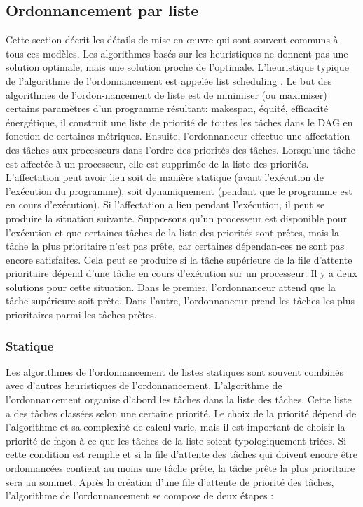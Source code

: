 \subsection{Ordonnancement par liste}
%
Cette section décrit les détails de mise en œuvre qui sont souvent communs à tous ces modèles. 
Les algorithmes basés sur les heuristiques ne donnent pas une solution optimale, mais une solution proche de l'optimale. 
L'heuristique typique de l'algorithme de l'ordonnancement est appelée list scheduling \cite{KA99}. 
Le but des algorithmes de l'ordon-nancement de liste est de minimiser (ou maximiser) certains paramètres d'un programme résultant: makespan, équité, efficacité énergétique, 
il construit une liste de priorité de toutes les tâches dans le DAG en fonction de certaines métriques. 
Ensuite, l'ordonnanceur effectue une affectation des tâches aux processeurs dans l'ordre des priorités des tâches. 
Lorsqu'une tâche est affectée à un processeur, elle est supprimée de la liste des priorités. 
L'affectation peut avoir lieu 
soit de manière statique (avant l'exécution de l'exécution du programme), 
soit dynamiquement (pendant que le programme est en cours d'exécution). 
Si l'affectation a lieu pendant l'exécution, il peut se produire la situation suivante. 
Suppo-sons qu'un processeur est disponible pour l'exécution et que certaines tâches de la liste des priorités sont prêtes, 
mais la tâche la plus prioritaire n'est pas prête, car certaines dépendan-ces ne sont pas encore satisfaites. 
Cela peut se produire si la tâche supérieure de la file d'attente prioritaire dépend d'une tâche en cours d'exécution sur un processeur. 
Il y a deux solutions pour cette situation. 
Dans le premier, l'ordonnanceur attend que la tâche supérieure soit prête. 
Dans l'autre, l'ordonnanceur prend les tâches les plus prioritaires parmi les tâches prêtes. 
%
\subsubsection{Statique}
%
Les algorithmes de l'ordonnancement de listes statiques sont souvent combinés avec d'autres heuristiques de l'ordonnancement. 
L'algorithme de l'ordonnancement organise d'abord les tâches dans la liste des tâches. 
Cette liste a des tâches classées selon une certaine priorité. 
Le choix de la priorité dépend de l'algorithme et sa complexité de calcul varie, mais il est important de choisir la priorité de façon à ce que les tâches de la liste soient typologiquement triées. 
Si cette condition est remplie et si la file d'attente des tâches qui doivent encore être ordonnancées contient au moins une tâche prête, 
la tâche prête la plus prioritaire sera au sommet. 
Après la création d'une file d'attente de priorité des tâches, l'algorithme de l'ordonnancement se compose de deux étapes \cite{KA99}: 

